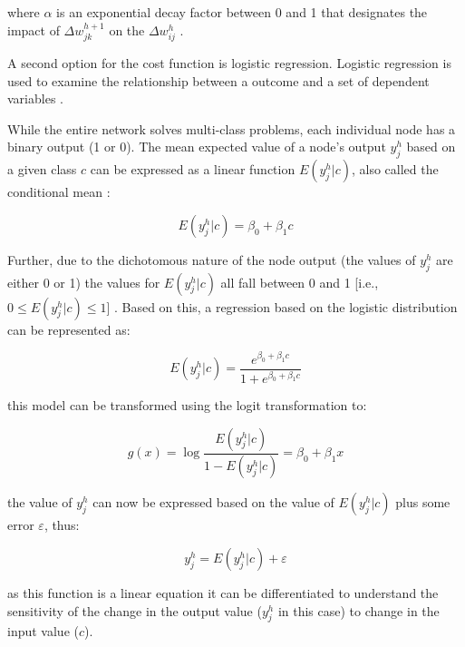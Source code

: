 \documentclass{IEEEtran}
\begin{document}
where $\alpha$ is an exponential decay factor between 0 and 1 that designates the impact of $\Delta w^{h+1}_{jk}$ on the $\Delta w^h_{ij}$ \cite{rumelhart1988learning}.


A second option for the cost function is logistic regression. Logistic regression is used to examine the relationship between a outcome and a set of dependent variables \cite{hosmer2013applied}. 

While the entire network solves multi-class problems, each individual node has a binary output (1 or 0). The mean expected value of a node's output $y^h_j$ based on a given class $c$ can be expressed as a linear function $E(y^h_j|c)$, also called the conditional mean \cite{hosmer2013applied}:

\begin{equation}
\label{eqn_regression1}
E(y^h_j|c) =  \beta_0 + \beta_1c
\end{equation}

Further, due to the dichotomous nature of the node output (the values of $y^h_j$ are either 0 or 1) the values for $E(y^h_j|c)$ all fall between 0 and 1
 [i.e., $ 0\leq E(y^h_j|c) \leq1 $] \cite{hosmer2013applied}. Based on this, a regression based on the logistic distribution can be represented as:
 
 \begin{equation}
\label{eqn_regression2}
E(y^h_j|c) =  \frac{e^{\beta_0 + \beta_1c}}{1+e^{\beta_0 + \beta_1c}}
\end{equation}

this model can be transformed using the logit transformation to:

\begin{equation}
\label{eqn_regression3}
g(x) = \log \frac{E(y^h_j|c)}{1 - E(y^h_j|c)} = \beta_0 + \beta_1x
\end{equation}

the value of $y^h_j$ can now be expressed based on the value of $E(y^h_j|c)$ plus some error $\varepsilon$, thus:

 \begin{equation}
\label{eqn_regression4}
y^h_j = E(y^h_j|c) + \varepsilon
\end{equation}

as this function is a linear equation it can be differentiated to understand the sensitivity of the change in the output value ($y^h_j$ in this case) to change in the input value ($c$). 
\end{document}
